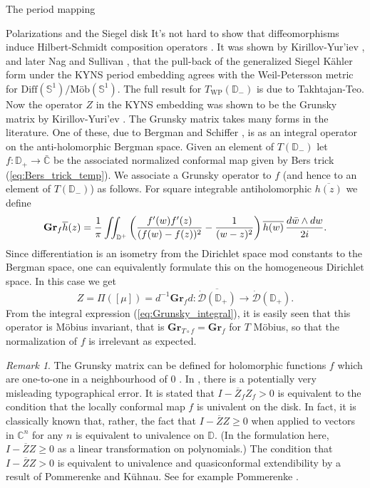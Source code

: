 \documentclass[12pt]{amsart}
\newcommand{\disk}{\ensuremath{\mathbb{D}} } %
\newcommand{\sphere}{\bar{\Bbb{C}}} %
\renewcommand{\Bbb}[1]{\ensuremath{\mathbb{#1}}}
\theoremstyle{plain}
\theoremstyle{definition}
\theoremstyle{remark}
\newtheorem{remark}[theorem]{Remark}
\numberwithin{equation}{section} %
\numberwithin{figure}{section} %
\begin{document}
\begin{section}{The period mapping}
\begin{subsection}{Polarizations and the Siegel disk}
  It's not hard to show that diffeomorphisms induce Hilbert-Schmidt composition operators \cite{SegalUnitary}. 
  It was shown by Kirillov-Yur'iev \cite{KY2}, and later Nag and Sullivan \cite{Nag_bulletin}, that the pull-back of the generalized Siegel K\"ahler form under the KYNS period embedding agrees with the Weil-Petersson metric for $\text{Diff}(\mathbb{S}^1)/\text{M\"ob}(\mathbb{S}^1)$. The full result for $T_{\mathrm{WP}}(\disk_-)$ is due to Takhtajan-Teo.\\
  
   Now the operator $Z$ in the KYNS embedding was shown to be the Grunsky matrix by Kirillov-Yuri'ev \cite{KY2}.
   The Grunsky matrix takes many forms in the literature. One of these, due to Bergman and Schiffer \cite{BergmanSchiffer}, is as an integral operator on the anti-holomorphic Bergman space.  Given an element of $T(\disk_-)$ let $f:\mathbb{D}_+ \rightarrow \sphere$ be the associated normalized conformal map given by Bers trick (\ref{eq:Bers_trick_temp}). We associate a Grunsky operator to $f$ (and hence to an element of $T(\disk_-)$) as follows. For square integrable antiholomorphic $\overline{h(z)}$ we define 
   \begin{equation}  \label{eq:Grunsky_integral}  
   {\bf{Gr}}_f \overline{h}(z) 
     = \frac{1}{\pi} \iint_{\disk^+}   \left( \frac{f'(w) f'(z)}{(f(w)-f(z))^2} - \frac{1}{(w-z)^2} \right) \overline{h(w)}\,\frac{d\bar{w} \wedge dw}{2i}.   
  \end{equation} 
  Since differentiation is an isometry from the Dirichlet space mod constants to the Bergman space, one can equivalently formulate this on the homogeneous Dirichlet space. In this case we get 
  \begin{equation} \label{eq:Grunsky_Schiffer_connection} 
   Z = \Pi([\mu]) = d^{-1} \mathbf{Gr}_f d: \overline{\dot{\mathcal{D}}(\disk_+)} \rightarrow \dot{\mathcal{D}}(\disk_+).    
  \end{equation}
   From the integral expression (\ref{eq:Grunsky_integral}), it is easily seen that this operator is M\"obius invariant, that is $\mathbf{Gr}_{T \circ f}=\mathbf{Gr}_f$ for $T$ M\"obius, so that the normalization of $f$ is irrelevant as expected.  
   {\begin{remark}  The Grunsky matrix can be defined for holomorphic functions $f$ which are one-to-one in a neighbourhood of $0$ \cite{Durenbook,Pommerenkebook}.  In \cite{KY2}, there is a potentially very misleading typographical error. It is stated that $I- \overline{Z}_f Z_f>0$ is equivalent to the condition that the locally conformal map $f$ is univalent on the disk. In fact, it is classically known that, rather, the fact that $I-\overline{Z} Z \geq 0$ when applied to vectors in $\mathbb{C}^n$ for any $n$ is equivalent to univalence on $\disk$. (In the formulation here, $I-\overline{Z} Z \geq 0$ as a linear transformation on polynomials.) The condition that $I-\overline{Z} Z > 0$  is equivalent to univalence and quasiconformal extendibility by a result of Pommerenke and K\"uhnau.  See for example Pommerenke \cite{Pommerenkebook}. 
   \end{remark}
   }
   

\end{subsection}
\end{section}
\end{document}
